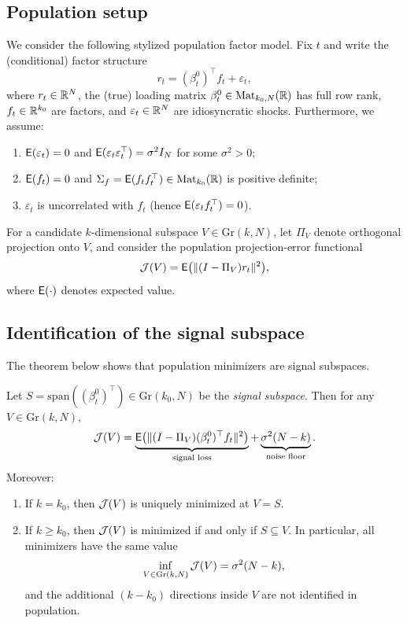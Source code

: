 \documentclass[twoside,11pt,letter]{article}
\begin{document}
\subsection{Population setup}

We consider the following stylized population factor model. Fix $t$ and write the (conditional) factor structure
\begin{equation}\label{eq:pop-factor-model}
r_t = (\beta_t^0)^\top f_t + \varepsilon_t,
\end{equation}
where $r_t\in\mathbb{R}^N$, the (true) loading matrix $\beta_t^0\in \mathrm{Mat}_{k_0,N}(\mathbb{R})$ has full row rank, $f_t\in\mathbb{R}^{k_0}$ are factors, and $\varepsilon_t\in\mathbb{R}^N$ are idiosyncratic shocks. Furthermore, we assume:
\begin{enumerate}[label=(A\arabic*)]
\item\label{A1} $\mathsf{E}(\varepsilon_t)=0$ and $\mathsf{E}(\varepsilon_t\varepsilon_t^\top)=\sigma^2 I_N$ for some $\sigma^2>0$;
\item\label{A2} $\mathsf{E}(f_t)=0$ and $\Sigma_f=\mathsf{E}(f_t f_t^\top)\in \mathrm{Mat}_{k_0}(\mathbb{R})$ is positive definite;
\item\label{A3} $\varepsilon_t$ is uncorrelated with $f_t$ (hence $\mathsf{E}(\varepsilon_t f_t^\top)=0$).
\end{enumerate}

For a candidate $k$-dimensional subspace $V\in \mathrm{Gr}(k,N)$, let $\Pi_V$ denote orthogonal projection onto $V$, and consider the population projection-error functional
\begin{equation}\label{eq:pop-functional}
{\mathcal{J}}(V)=\mathsf{E}\big(\|(I-\Pi_V)r_t\|^2\big),
\end{equation}
where $\mathsf{E}(\cdot)$ denotes expected value.

\subsection{Identification of the signal subspace}

The theorem below shows that population minimizers are signal subspaces.
\begin{theorem}\label{thm:pop-signal-subspace}
Let $S=\mathrm{span}((\beta_t^0)^\top)\in \mathrm{Gr}(k_0,N)$ be the \emph{signal subspace}. Then for any $V\in \mathrm{Gr}(k,N)$,
\begin{equation}\label{eq:pop-decomp}
{\mathcal{J}}(V)=\underbrace{\mathsf{E}\big(\|(I-\Pi_V)(\beta_t^0)^\top f_t\|^2\big)}_{\text{signal loss}}+\underbrace{\sigma^2(N-k)}_{\text{noise floor}}.
\end{equation}
Moreover:
\begin{enumerate}[label=(\roman*)]
\item If $k=k_0$, then ${\mathcal{J}}(V)$ is uniquely minimized at $V=S$.
\item If $k\ge k_0$, then ${\mathcal{J}}(V)$ is minimized if and only if $S\subseteq V$. In particular, all minimizers have the same value
\begin{equation*}
\inf_{V\in \mathrm{Gr}(k,N)}{\mathcal{J}}(V)=\sigma^2(N-k),
\end{equation*}
and the additional $(k-k_0)$ directions inside $V$ are not identified in population.
\end{enumerate}
\end{theorem}
\end{document}
